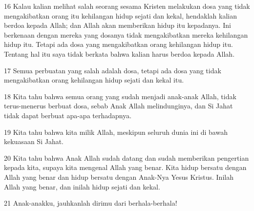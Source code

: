 \par 16 Kalau kalian melihat salah seorang sesama Kristen melakukan dosa yang tidak mengakibatkan orang itu kehilangan hidup sejati dan kekal, hendaklah kalian berdoa kepada Allah; dan Allah akan memberikan hidup itu kepadanya. Ini berkenaan dengan mereka yang dosanya tidak mengakibatkan mereka kehilangan hidup itu. Tetapi ada dosa yang mengakibatkan orang kehilangan hidup itu. Tentang hal itu saya tidak berkata bahwa kalian harus berdoa kepada Allah.
\par 17 Semua perbuatan yang salah adalah dosa, tetapi ada dosa yang tidak mengakibatkan orang kehilangan hidup sejati dan kekal itu.
\par 18 Kita tahu bahwa semua orang yang sudah menjadi anak-anak Allah, tidak terus-menerus berbuat dosa, sebab Anak Allah melindunginya, dan Si Jahat tidak dapat berbuat apa-apa terhadapnya.
\par 19 Kita tahu bahwa kita milik Allah, meskipun seluruh dunia ini di bawah kekuasaan Si Jahat.
\par 20 Kita tahu bahwa Anak Allah sudah datang dan sudah memberikan pengertian kepada kita, supaya kita mengenal Allah yang benar. Kita hidup bersatu dengan Allah yang benar dan hidup bersatu dengan Anak-Nya Yesus Kristus. Inilah Allah yang benar, dan inilah hidup sejati dan kekal.
\par 21 Anak-anakku, jauhkanlah dirimu dari berhala-berhala!


